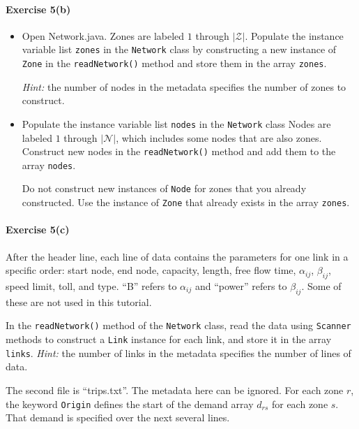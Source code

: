 \documentclass[11pt]{article}
\newcommand{\N}{\mathcal{N}}
\newcommand{\Z}{\mathcal{Z}}
\begin{document}
\vspace{\baselineskip}

\paragraph*{Exercise 5(b)}  \begin{itemize}
	\item Open Network.java. Zones are labeled $1$ through $\vert \Z \vert$. Populate the instance variable list \texttt{zones} in the \texttt{Network} class by constructing a new instance of \texttt{Zone} in the  \texttt{readNetwork()} method and store them in the array \texttt{zones}.
	
	\textit{Hint:} the number of nodes in the metadata specifies the number of zones to construct.
	
	\item Populate the instance variable list \texttt{nodes}  in the \texttt{Network} class Nodes are labeled $1$ through $\vert \N \vert$, which includes some nodes that are also zones. Construct new nodes in the  \texttt{readNetwork()} method and add them to the array \texttt{nodes}.
	
	Do not construct new instances of \texttt{Node} for  zones that you already constructed. Use the instance of \texttt{Zone} that already exists in the array \texttt{zones}. 
\end{itemize} 

\paragraph*{Exercise 5(c)} After the header line, each line of data contains the parameters for one link in a specific order: start node, end node, capacity, length, free flow time, $\alpha_{ij}$, $\beta_{ij}$, speed limit, toll, and type. ``B'' refers to $\alpha_{ij}$ and ``power'' refers to $\beta_{ij}$. Some of these are not used in this tutorial. 

In the \texttt{readNetwork()} method of the \texttt{Network} class, read the data using \texttt{Scanner} methods to construct a \texttt{Link} instance for each link, and store it in the array \texttt{links}. \textit{Hint:} the number of links in the metadata specifies the number of lines of data. 


\vspace{\baselineskip}

\noindent
The second file is ``trips.txt''. The metadata here can be ignored. For each zone $r$, the keyword \texttt{Origin} defines the start of the demand array $d_{rs}$ for each zone $s$. That demand is specified over the next several lines.
\end{document}

